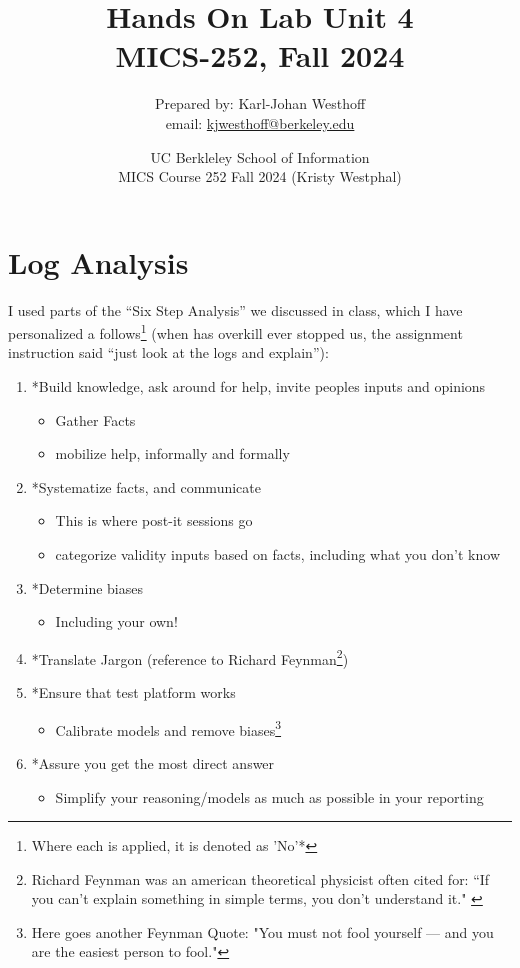 \documentclass[
	letterpaper, %
	10pt, %
	unnumberedsections, %
	twoside, %
]{APAAssignment}
\title{Hands On Lab Unit 4 \\ MICS-252, Fall 2024} %
\date{UC Berkleley School of Information \\
MICS Course 252 Fall 2024 (Kristy Westphal)
}
\author{
	Prepared by: Karl-Johan Westhoff \\
	email: \href{mailto:kjwesthoff@berkeley.edu}{kjwesthoff@berkeley.edu}
}
\begin{document}
\onecolumn
\maketitle %



\section{Log Analysis}\label{log-analysis}

I used parts of the ``Six Step Analysis'' we discussed in class, which I have personalized a follows\footnote{Where each is applied, it is denoted as 'No'*} (when has overkill ever stopped us, the assignment instruction said ``just look at the logs and explain''):
\begin{enumerate}
	\item *Build knowledge, ask around for help, invite peoples inputs and opinions
	      \begin{itemize}
		      \item Gather Facts
		      \item mobilize help, informally and formally
	      \end{itemize}
	\item *Systematize facts, and communicate
	      \begin{itemize}
		      \item This is where post-it sessions go
		      \item categorize validity inputs based on facts, including what you don't know
	      \end{itemize}
	\item *Determine biases
	      \begin{itemize}
		      \item Including your own!
	      \end{itemize}
	\item *Translate Jargon (reference to Richard Feynman\footnote{Richard Feynman was an american theoretical physicist often cited for: “If you can't explain something in simple terms, you don't understand it."\cite{FeynmanMedium} \cite{FeynmanWikipedia}})
	\item *Ensure that test platform works
	      \begin{itemize}
		      \item Calibrate models and remove biases\footnote{Here goes another Feynman Quote: "You must not fool yourself — and you are the easiest person to fool."\cite{FeynmanFoolOurselves}}
	      \end{itemize}
	\item *Assure you get the most direct answer
	      \begin{itemize}
		      \item Simplify your reasoning/models as much as possible in your reporting
	      \end{itemize}
\end{enumerate}
\end{document}
